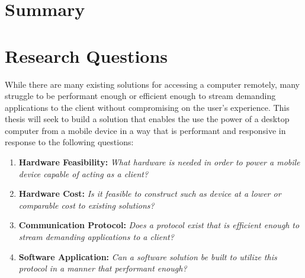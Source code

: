 \section{Summary}\label{sec:StateOfTheArtSummary}

\todosection

\section{Research Questions}\label{sec:ResearchQuestions}

While there are many existing solutions for accessing a computer remotely, many struggle to be performant enough or efficient enough to stream demanding applications to the client without compromising on the user's experience.
This thesis will seek to build a solution that enables the use the power of a desktop computer from a mobile device in a way that is performant and responsive in response to the following questions:

\begin{enumerate}
  \item \textbf{Hardware Feasibility:} \emph{What hardware is needed in order to power a mobile device capable of acting as a client?}
  \item \textbf{Hardware Cost:} \emph{Is it feasible to construct such as device at a lower or comparable cost to existing solutions?}
  \item \textbf{Communication Protocol:} \emph{Does a protocol exist that is efficient enough to stream demanding applications to a client?}
  \item \textbf{Software Application:} \emph{Can a software solution be built to utilize this protocol in a manner that performant enough?}
\end{enumerate}
